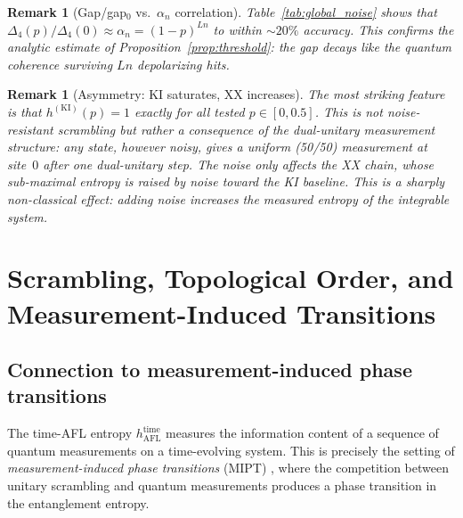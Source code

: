 \documentclass[12pt,a4paper]{article}
\newtheorem{remark}[theorem]{Remark}
\begin{document}
\begin{remark}[Gap/gap$_0$ vs.\ $\alpha_n$ correlation]
Table~\ref{tab:global_noise} shows that $\Delta_4(p)/\Delta_4(0)
\approx\alpha_n=(1-p)^{Ln}$ to within $\sim 20\%$ accuracy.
This confirms the analytic estimate of Proposition~\ref{prop:threshold}:
the gap decays like the quantum coherence surviving $Ln$ depolarizing hits.
\end{remark}

\begin{remark}[Asymmetry: KI saturates, XX increases]
The most striking feature is that $h^{(\mathrm{KI})}(p)=1$ exactly for all
tested $p\in[0,0.5]$.  This is not noise-resistant scrambling but rather a
consequence of the dual-unitary measurement structure: any state, however
noisy, gives a uniform (50/50) measurement at site~$0$ after one dual-unitary
step.  The noise only affects the \emph{XX chain}, whose sub-maximal
entropy is raised by noise toward the KI baseline.  This is a sharply
non-classical effect: adding noise increases the measured entropy of the
integrable system.
\end{remark}

\section{Scrambling, Topological Order, and Measurement-Induced Transitions}
\label{sec:mit}

\subsection{Connection to measurement-induced phase transitions}

The time-AFL entropy $h_{\mathrm{AFL}}^{\mathrm{time}}$ measures the
information content of a sequence of quantum measurements on a
time-evolving system.  This is precisely the setting of
\emph{measurement-induced phase transitions} (MIPT) \cite{nag2019,skinner2019},
where the competition between unitary scrambling and quantum measurements
produces a phase transition in the entanglement entropy.
\end{document}
